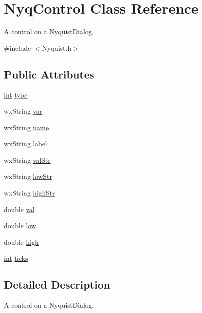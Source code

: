 \hypertarget{class_nyq_control}{}\section{Nyq\+Control Class Reference}
\label{class_nyq_control}


A control on a Nyquist\+Dialog.  




{\ttfamily \#include $<$Nyquist.\+h$>$}

\subsection*{Public Attributes}
\begin{DoxyCompactItemize}
\item 
\hyperlink{xmltok_8h_a5a0d4a5641ce434f1d23533f2b2e6653}{int} \hyperlink{class_nyq_control_aae478bdf7afdea770edc3581ebdb8090}{type}
\item 
wx\+String \hyperlink{class_nyq_control_a4d04c6ba2c0853380997e04ecb9eca92}{var}
\item 
wx\+String \hyperlink{class_nyq_control_a43945e9380376f91f123698b60630650}{name}
\item 
wx\+String \hyperlink{class_nyq_control_a3a5f36bca932d5109e3086b11591e85a}{label}
\item 
wx\+String \hyperlink{class_nyq_control_ab8f70b3aa4cb16336b48c1324013cd19}{val\+Str}
\item 
wx\+String \hyperlink{class_nyq_control_ae0b7dc3637e5d516c7879eb1825c33df}{low\+Str}
\item 
wx\+String \hyperlink{class_nyq_control_a0134301593f9fe8fa29240273e9c759c}{high\+Str}
\item 
double \hyperlink{class_nyq_control_adfa3e7f7d9abb87f6abdb6c5d05e1dc6}{val}
\item 
double \hyperlink{class_nyq_control_ac2d35c2008ae1b760eb2336f55e68d60}{low}
\item 
double \hyperlink{class_nyq_control_a29bf657124097d83e401230f06b152a7}{high}
\item 
\hyperlink{xmltok_8h_a5a0d4a5641ce434f1d23533f2b2e6653}{int} \hyperlink{class_nyq_control_a7a2169aad60ff2858141b2a21a2f0061}{ticks}
\end{DoxyCompactItemize}


\subsection{Detailed Description}
A control on a Nyquist\+Dialog. 

